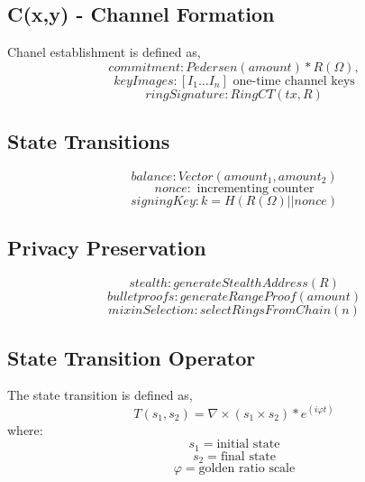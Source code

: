\documentclass[11pt]{amsart}
\begin{document}
\subsection{C(x,y) - Channel Formation} 
Chanel establishment is defined as,
\begin{equation*}
commitment: Pedersen(amount) * R(\Omega),
\end{equation*}
\begin{equation*}
keyImages: [I_1...I_n] \text{ one-time channel keys}
\end{equation*}
\begin{equation*}
ringSignature: RingCT(tx, R)
\end{equation*}

\subsection{State Transitions} 
\begin{equation*}
balance: Vector(amount_1, amount_2)
\end{equation*}
\begin{equation*}
nonce: \text{ incrementing counter}
\end{equation*}
\begin{equation*}
signingKey: k = H(R(\Omega) || nonce)
\end{equation*}

\subsection{Privacy Preservation} 
\begin{equation*}
stealth: generateStealthAddress(R)
\end{equation*}
\begin{equation*}
bulletproofs: generateRangeProof(amount)
\end{equation*}
\begin{equation*}
mixinSelection: selectRingsFromChain(n)
\end{equation*}

\subsection{State Transition Operator} 
The state transition is defined as,
\begin{equation*}
T(s_1, s_2) = \nabla \times (s_1 \times s_2) * e^{(i \varphi t)}
\end{equation*}
where:
\begin{equation*}
s_1 = \text{initial state}
\end{equation*}
\begin{equation*}
 s_2 = \text{final state}
\end{equation*}
\begin{equation*}
\varphi = \text{golden ratio scale}
\end{equation*}
\end{document}
